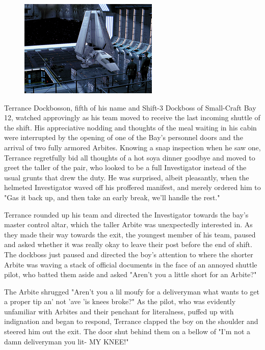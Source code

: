 \begin{figure}
	\begin{center}
		\includegraphics[width=\figwidth]{pics/20/8.png}
	\end{center}
\end{figure}

Terrance Dockbosson, fifth of his name and Shift-3 Dockboss of Small-Craft Bay 12, watched approvingly as his team moved to receive the last incoming shuttle of the shift. 
His appreciative nodding and thoughts of the meal waiting in his cabin were interrupted by the opening of one of the Bay's personnel doors and the arrival of two fully armored Arbites. 
Knowing a snap inspection when he saw one, Terrance regretfully bid all thoughts of a hot soya dinner goodbye and moved to greet the taller of the pair, who looked to be a full Investigator instead of the usual grunts that drew the duty. 
He was surprised, albeit pleasantly, when the helmeted Investigator waved off his proffered manifest, and merely ordered him to "Gas it back up, and then take an early break, we'll handle the rest." 

Terrance rounded up his team and directed the Investigator towards the bay's master control altar, which the taller Arbite was unexpectedly interested in. 
As they made their way towards the exit, the youngest member of his team, paused and asked whether it was really okay to leave their post before the end of shift. 
The dockboss just paused and directed the boy's attention to where the shorter Arbite was waving a stack of official documents in the face of an annoyed shuttle pilot, who batted them aside and asked "Aren't you a little short for an Arbite?"

The Arbite shrugged "Aren't you a lil moufy for a deliveryman what wants to get a proper tip an' not 'ave 'is knees broke?" As the pilot, who was evidently unfamiliar with Arbites and their penchant for literalness, puffed up with indignation and began to respond, Terrance clapped the boy on the shoulder and steered him out the exit. 
The door shut behind them on a bellow of "I'm not a damn deliveryman you lit- MY KNEE!"

